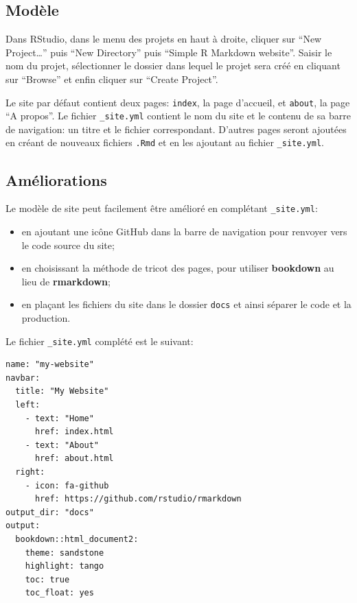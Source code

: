 \documentclass[
  12pt,
  french,
  a4paper,
  extrafontsizes,onecolumn,openright
  ]{memoir}
\providecommand{\tightlist}{%
  \setlength{\itemsep}{0pt}\setlength{\parskip}{0pt}}
\begin{document}
\subsection{Modèle}\label{moduxe8le}

Dans RStudio, dans le menu des projets en haut à droite, cliquer sur \enquote{New Project\ldots{}} puis \enquote{New Directory} puis \enquote{Simple R Markdown website}.
Saisir le nom du projet, sélectionner le dossier dans lequel le projet sera créé en cliquant sur \enquote{Browse} et enfin cliquer sur \enquote{Create Project}.

Le site par défaut contient deux pages: \texttt{index}, la page d'accueil, et \texttt{about}, la page \enquote{A propos}.
Le fichier \texttt{\_site.yml} contient le nom du site et le contenu de sa barre de navigation: un titre et le fichier correspondant.
D'autres pages seront ajoutées en créant de nouveaux fichiers \texttt{.Rmd} et en les ajoutant au fichier \texttt{\_site.yml}.

\subsection{Améliorations}\label{amuxe9liorations}

Le modèle de site peut facilement être amélioré en complétant \texttt{\_site.yml}:

\begin{itemize}
\tightlist
\item
  en ajoutant une icône GitHub dans la barre de navigation pour renvoyer vers le code source du site;
\item
  en choisissant la méthode de tricot des pages, pour utiliser \textbf{bookdown} au lieu de \textbf{rmarkdown};
\item
  en plaçant les fichiers du site dans le dossier \texttt{docs} et ainsi séparer le code et la production.
\end{itemize}

Le fichier \texttt{\_site.yml} complété est le suivant:

\begin{verbatim}
name: "my-website"
navbar:
  title: "My Website"
  left:
    - text: "Home"
      href: index.html
    - text: "About"
      href: about.html
  right:
    - icon: fa-github
      href: https://github.com/rstudio/rmarkdown
output_dir: "docs"
output:
  bookdown::html_document2:
    theme: sandstone
    highlight: tango
    toc: true
    toc_float: yes
\end{verbatim}
\end{document}
